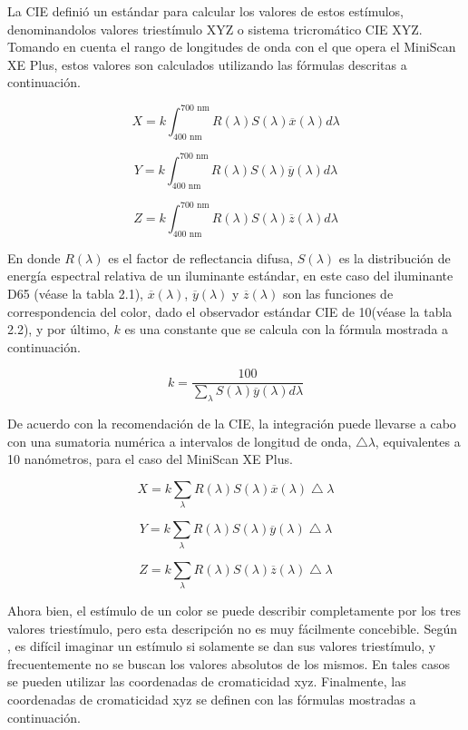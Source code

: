		La CIE defini\'{o} un est\'{a}ndar para calcular los valores de estos est\'{i}mulos, denominandolos valores triest\'{i}mulo XYZ o sistema tricrom\'{a}tico CIE XYZ. Tomando en cuenta el rango de longitudes de onda con el que opera el \mbox{MiniScan} XE Plus, estos valores son calculados utilizando las f\'{o}rmulas descritas a continuaci\'{o}n.
		
		$$X = k \int_{400 \text{ nm}}^{700 \text{ nm}} R(\lambda) S(\lambda) \overline{x}(\lambda)d\lambda$$
		
		$$Y = k \int_{400 \text{ nm}}^{700 \text{ nm}} R(\lambda) S(\lambda) \overline{y}(\lambda)d\lambda$$
		
		$$Z = k \int_{400 \text{ nm}}^{700 \text{ nm}} R(\lambda) S(\lambda) \overline{z}(\lambda)d\lambda$$
		
		En donde $R(\lambda)$ es el factor de reflectancia difusa, $S(\lambda)$ es la distribuci\'{o}n de energ\'{i}a espectral relativa de un iluminante est\'{a}ndar, en este caso del iluminante D65 (v\'{e}ase la tabla 2.1), $\overline{x}(\lambda)$, $\overline{y}(\lambda)$ y $\overline{z}(\lambda)$ son las funciones de correspondencia del color, dado el observador est\'{a}ndar CIE de 10\degree (v\'{e}ase la tabla 2.2), y por \'{u}ltimo, $k$ es una constante que se calcula con la f\'{o}rmula mostrada a continuaci\'{o}n.
		
		$$k = \frac{100}{\sum_{\lambda} S(\lambda) \overline{y}(\lambda)d\lambda}$$
		
		De acuerdo con la recomendaci\'{o}n de la CIE, la integraci\'{o}n puede llevarse a cabo con una sumatoria num\'{e}rica a intervalos de longitud de onda, $\bigtriangleup\lambda$, equivalentes a 10 nan\'{o}metros, para el caso del MiniScan XE Plus.
		
		$$X = k \sum_{\lambda} R(\lambda) S(\lambda) \overline{x}(\lambda)\bigtriangleup\lambda$$
		
		$$Y = k \sum_{\lambda} R(\lambda) S(\lambda) \overline{y}(\lambda)\bigtriangleup\lambda$$
		
		$$Z = k \sum_{\lambda} R(\lambda) S(\lambda) \overline{z}(\lambda)\bigtriangleup\lambda$$
		
		Ahora bien, el est\'{i}mulo de un color se puede describir completamente por los tres valores triest\'{i}mulo, pero esta descripci\'{o}n no es muy f\'{a}cilmente concebible. Seg\'{u}n \cite{Schanda}, es dif\'{i}cil imaginar un est\'{i}mulo si solamente se dan sus valores triest\'{i}mulo, y frecuentemente no se buscan los valores absolutos de los mismos. En tales casos se pueden utilizar las coordenadas de cromaticidad xyz. Finalmente, las coordenadas de cromaticidad xyz se definen con las f\'{o}rmulas mostradas a continuaci\'{o}n.
		
